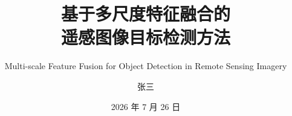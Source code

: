 
\title[多尺度特征融合的遥感目标检测]{基于多尺度特征融合的\\遥感图像目标检测方法}
\subtitle{Multi-scale Feature Fusion for Object Detection in Remote Sensing Imagery}

\author[张三]{张三}


\date{2026 年 7 月 26 日}



